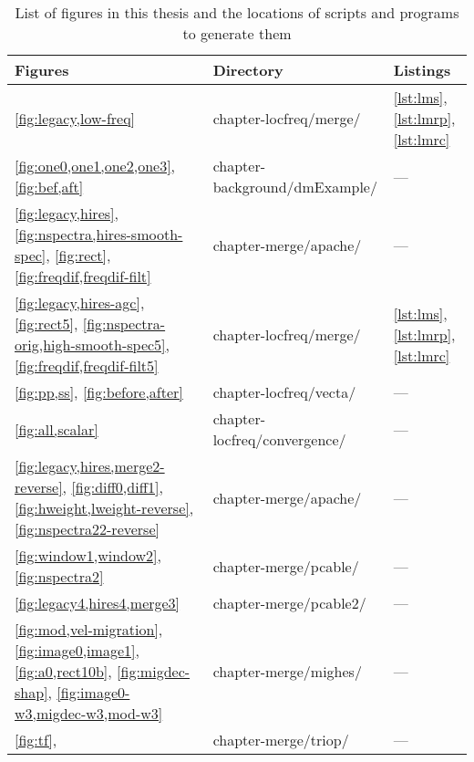 \begin{table}[h]
\centering
\caption{List of figures in this thesis and the locations of scripts and programs to generate them}
\label{my-label}
\begin{tabular}{l|l|l}
\hline
        \textbf{Figures} & \textbf{Directory} & \textbf{Listings} \\ \hline 
        \ref{fig:legacy,low-freq} & chapter-locfreq/merge/ & \ref{lst:lms}, \ref{lst:lmrp}, \ref{lst:lmrc}\\ 
        \ref{fig:one0,one1,one2,one3}, \ref{fig:bef,aft} & chapter-background/dmExample/ & ---\\%
        \ref{fig:legacy,hires}, \ref{fig:nspectra,hires-smooth-spec}, \ref{fig:rect}, \ref{fig:freqdif,freqdif-filt}           & chapter-merge/apache/ & ---\\%
        \ref{fig:legacy,hires-agc}, \ref{fig:rect5}, \ref{fig:nspectra-orig,high-smooth-spec5}, \ref{fig:freqdif,freqdif-filt5}          & chapter-locfreq/merge/ &   \ref{lst:lms}, \ref{lst:lmrp}, \ref{lst:lmrc}\\ 
        \ref{fig:pp,ss}, \ref{fig:before,after}         & chapter-locfreq/vecta/&  --- \\%
        \ref{fig:all,scalar} & chapter-locfreq/convergence/&  --- \\%
        \ref{fig:legacy,hires,merge2-reverse}, \ref{fig:diff0,diff1}, \ref{fig:hweight,lweight-reverse}, \ref{fig:nspectra22-reverse}           & chapter-merge/apache/ & --- \\%
        \ref{fig:window1,window2}, \ref{fig:nspectra2} & chapter-merge/pcable/ & --- \\%
        \ref{fig:legacy4,hires4,merge3}  & chapter-merge/pcable2/ &  --- \\%
        \ref{fig:mod,vel-migration}, \ref{fig:image0,image1}, \ref{fig:a0,rect10b}, \ref{fig:migdec-shap}, \ref{fig:image0-w3,migdec-w3,mod-w3} & chapter-merge/mighes/ & --- \\%
        \ref{fig:tf}, & chapter-merge/triop/ & --- \\%
\end{tabular}
\end{table}


